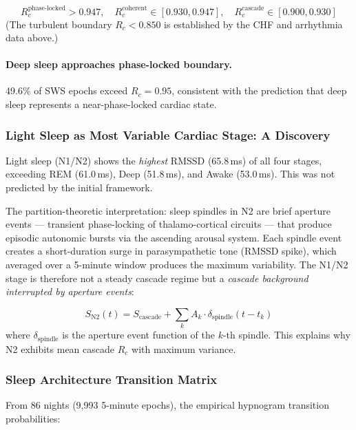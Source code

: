 \documentclass[12pt,a4paper]{article}
\theoremstyle{definition}
\begin{document}
\begin{equation}
R_c^{\text{phase-locked}} > 0.947,\quad
R_c^{\text{coherent}} \in [0.930, 0.947],\quad
R_c^{\text{cascade}} \in [0.900, 0.930]
\end{equation}
(The turbulent boundary $R_c < 0.850$ is established by the CHF and arrhythmia
data above.)

\paragraph{Deep sleep approaches phase-locked boundary.}
49.6\% of SWS epochs exceed $R_c = 0.95$, consistent with the prediction
that deep sleep represents a near-phase-locked cardiac state.

\subsubsection{Light Sleep as Most Variable Cardiac Stage: A Discovery}

Light sleep (N1/N2) shows the \emph{highest} RMSSD (65.8\,ms) of all four
stages, exceeding REM (61.0\,ms), Deep (51.8\,ms), and Awake (53.0\,ms).
This was not predicted by the initial framework.

The partition-theoretic interpretation: sleep spindles in N2 are
brief aperture events --- transient phase-locking of thalamo-cortical
circuits --- that produce episodic autonomic bursts via the
ascending arousal system. Each spindle event creates a short-duration
surge in parasympathetic tone (RMSSD spike), which averaged over a
5-minute window produces the maximum variability. The N1/N2 stage is
therefore not a steady cascade regime but a \emph{cascade background
interrupted by aperture events}:

\begin{equation}
S_{\text{N2}}(t) = S_{\text{cascade}} + \sum_k A_k \cdot \delta_{\text{spindle}}(t - t_k)
\end{equation}
where $\delta_{\text{spindle}}$ is the aperture event function of the $k$-th
spindle. This explains why N2 exhibits mean cascade $R_c$ with maximum variance.

\subsubsection{Sleep Architecture Transition Matrix}

From 86 nights (9,993 5-minute epochs), the empirical hypnogram transition
probabilities:
\end{document}
